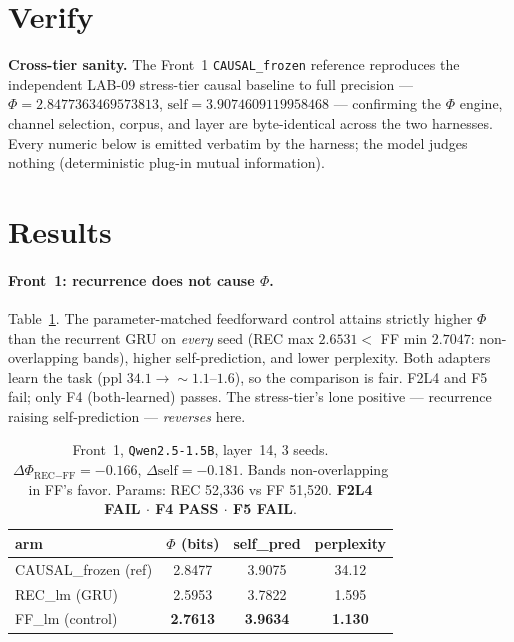 \documentclass[11pt,a4paper]{article}
\begin{document}
\section{Verify}
\label{sec:verify}

\textbf{Cross-tier sanity.} The Front~1 \texttt{CAUSAL\_frozen} reference
reproduces the independent LAB-09 stress-tier causal baseline to full precision
--- $\Phi=2.8477363469573813$, $\mathrm{self}=3.9074609119958468$ --- confirming
the $\Phi$ engine, channel selection, corpus, and layer are byte-identical across
the two harnesses. Every numeric below is emitted verbatim by the harness; the
model judges nothing (deterministic plug-in mutual information).

\section{Results}
\label{sec:results}

\paragraph{Front~1: recurrence does not cause $\Phi$.} Table~\ref{tab:front1}.
The parameter-matched feedforward control attains strictly higher $\Phi$ than the
recurrent GRU on \emph{every} seed (REC max $2.6531 <$ FF min $2.7047$:
non-overlapping bands), higher self-prediction, and lower perplexity. Both
adapters learn the task (ppl $34.1\to{\sim}1.1$--$1.6$), so the comparison is
fair. F2L4 and F5 fail; only F4 (both-learned) passes. The stress-tier's lone
positive --- recurrence raising self-prediction --- \emph{reverses} here.

\begin{table}[h]
\centering
\small
\begin{tabular}{lccc}
\toprule
\textbf{arm} & \textbf{$\Phi$ (bits)} & \textbf{self\_pred} & \textbf{perplexity} \\
\midrule
CAUSAL\_frozen (ref) & 2.8477 & 3.9075 & 34.12 \\
REC\_lm (GRU)        & 2.5953 \;{\scriptsize[2.49,\,2.65]} & 3.7822 & 1.595 \\
FF\_lm (control)     & \textbf{2.7613} \;{\scriptsize[2.70,\,2.82]} & \textbf{3.9634} & \textbf{1.130} \\
\bottomrule
\end{tabular}
\caption{Front~1, \texttt{Qwen2.5-1.5B}, layer~14, 3 seeds. $\Delta\Phi_{\text{REC}-\text{FF}}=-0.166$,
$\Delta\mathrm{self}=-0.181$. Bands non-overlapping in FF's favor. Params:
REC 52{,}336 vs FF 51{,}520. \textbf{F2L4 FAIL $\cdot$ F4 PASS $\cdot$ F5 FAIL}.}
\label{tab:front1}
\end{table}
\end{document}
